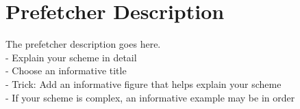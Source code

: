 \section{Prefetcher Description}
The prefetcher description goes here.
\\
- Explain your scheme in detail\\
- Choose an informative title\\
- Trick: Add an informative figure that helps explain 
your scheme\\
- If your scheme is complex, an informative example 
may be in order\\